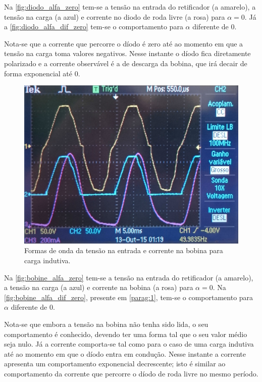 \documentclass[a4paper,11pt]{article}
\numberwithin{equation}{section}
\begin{document}
Na \autoref{fig:diodo_alfa_zero} tem-se a tensão na entrada do retificador (a amarelo), a tensão na carga (a azul) e corrente no diodo de roda livre (a rosa) para $\alpha = 0$. Já a \autoref{fig:diodo_alfa_dif_zero} tem-se o comportamento para $\alpha$ diferente de $0$.

Nota-se que a corrente que percorre o díodo é zero até ao momento em que a tensão na carga toma valores negativos. Nesse instante o díodo fica diretamente polarizado e a corrente observável é a de descarga da bobina, que irá decair de forma exponencial até $0$.

\begin{figure}[h]
	\centering
	\includegraphics[keepaspectratio=true, scale=0.11]{img/figs/bobine_alfa_zero}
	\caption{Formas de onda da tensão na entrada e corrente na bobina para carga indutiva.}
	\label{fig:bobine_alfa_zero}
	\vspace{-0.8em}
\end{figure}

Na \autoref{fig:bobine_alfa_zero} tem-se a tensão na entrada do retificador (a amarelo), a tensão na carga (a azul) e corrente na bobina (a rosa) para $\alpha = 0$. Na \autoref{fig:bobine_alfa_dif_zero}, presente em \autoref{parag:1}, tem-se o comportamento para $\alpha$ diferente de $0$.

Nota-se que embora a tensão na bobina não tenha sido lida, o seu comportamento é conhecido, devendo ter uma forma tal que o seu valor médio seja nulo. Já a corrente comporta-se tal como para o caso de uma carga indutiva até ao momento em que o díodo entra em condução. Nesse instante a corrente apresenta um comportamento exponencial decrescente; isto é similar ao comportamento da corrente que percorre o díodo de roda livre no mesmo período.
\end{document}
